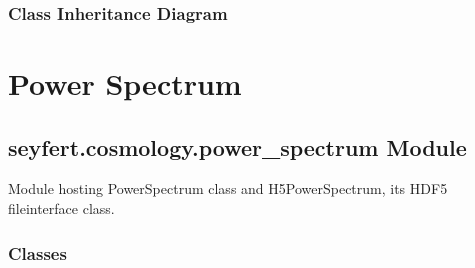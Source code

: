 \documentclass[letterpaper,10pt,english]{sphinxmanual}
\begin{document}
\subsubsection{Class Inheritance Diagram}
\label{\detokenize{parameter:class-inheritance-diagram}}


\section{Power Spectrum}
\label{\detokenize{power_spectrum:power-spectrum}}\label{\detokenize{power_spectrum::doc}}

\subsection{seyfert.cosmology.power\_spectrum Module}
\label{\detokenize{power_spectrum:module-seyfert.cosmology.power_spectrum}}\label{\detokenize{power_spectrum:seyfert-cosmology-power-spectrum-module}}
\sphinxAtStartPar
Module hosting PowerSpectrum class and H5PowerSpectrum, its HDF5 file\sphinxhyphen{}interface class.


\subsubsection{Classes}
\label{\detokenize{power_spectrum:classes}}
\end{document}
